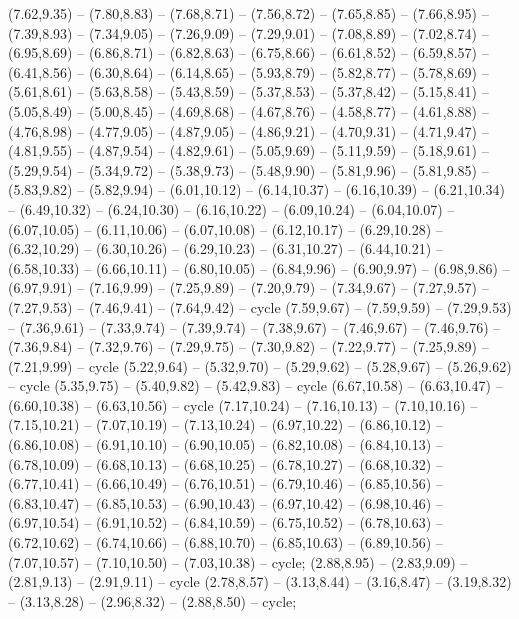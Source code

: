 { (7.62,9.35) -- (7.80,8.83) -- (7.68,8.71) -- (7.56,8.72) -- (7.65,8.85) -- (7.66,8.95) -- (7.39,8.93) -- (7.34,9.05) -- (7.26,9.09) -- (7.29,9.01) -- (7.08,8.89) -- (7.02,8.74) -- (6.95,8.69) -- (6.86,8.71) -- (6.82,8.63) -- (6.75,8.66) -- (6.61,8.52) -- (6.59,8.57) -- (6.41,8.56) -- (6.30,8.64) -- (6.14,8.65) -- (5.93,8.79) -- (5.82,8.77) -- (5.78,8.69) -- (5.61,8.61) -- (5.63,8.58) -- (5.43,8.59) -- (5.37,8.53) -- (5.37,8.42) -- (5.15,8.41) -- (5.05,8.49) -- (5.00,8.45) -- (4.69,8.68) -- (4.67,8.76) -- (4.58,8.77) -- (4.61,8.88) -- (4.76,8.98) -- (4.77,9.05) -- (4.87,9.05) -- (4.86,9.21) -- (4.70,9.31) -- (4.71,9.47) -- (4.81,9.55) -- (4.87,9.54) -- (4.82,9.61) -- (5.05,9.69) -- (5.11,9.59) -- (5.18,9.61) -- (5.29,9.54) -- (5.34,9.72) -- (5.38,9.73) -- (5.48,9.90) -- (5.81,9.96) -- (5.81,9.85) -- (5.83,9.82) -- (5.82,9.94) -- (6.01,10.12) -- (6.14,10.37) -- (6.16,10.39) -- (6.21,10.34) -- (6.49,10.32) -- (6.24,10.30) -- (6.16,10.22) -- (6.09,10.24) -- (6.04,10.07) -- (6.07,10.05) -- (6.11,10.06) -- (6.07,10.08) -- (6.12,10.17) -- (6.29,10.28) -- (6.32,10.29) -- (6.30,10.26) -- (6.29,10.23) -- (6.31,10.27) -- (6.44,10.21) -- (6.58,10.33) -- (6.66,10.11) -- (6.80,10.05) -- (6.84,9.96) -- (6.90,9.97) -- (6.98,9.86) -- (6.97,9.91) -- (7.16,9.99) -- (7.25,9.89) -- (7.20,9.79) -- (7.34,9.67) -- (7.27,9.57) -- (7.27,9.53) -- (7.46,9.41) -- (7.64,9.42) -- cycle (7.59,9.67) -- (7.59,9.59) -- (7.29,9.53) -- (7.36,9.61) -- (7.33,9.74) -- (7.39,9.74) -- (7.38,9.67) -- (7.46,9.67) -- (7.46,9.76) -- (7.36,9.84) -- (7.32,9.76) -- (7.29,9.75) -- (7.30,9.82) -- (7.22,9.77) -- (7.25,9.89) -- (7.21,9.99) -- cycle (5.22,9.64) -- (5.32,9.70) -- (5.29,9.62) -- (5.28,9.67) -- (5.26,9.62) -- cycle (5.35,9.75) -- (5.40,9.82) -- (5.42,9.83) -- cycle (6.67,10.58) -- (6.63,10.47) -- (6.60,10.38) -- (6.63,10.56) -- cycle (7.17,10.24) -- (7.16,10.13) -- (7.10,10.16) -- (7.15,10.21) -- (7.07,10.19) -- (7.13,10.24) -- (6.97,10.22) -- (6.86,10.12) -- (6.86,10.08) -- (6.91,10.10) -- (6.90,10.05) -- (6.82,10.08) -- (6.84,10.13) -- (6.78,10.09) -- (6.68,10.13) -- (6.68,10.25) -- (6.78,10.27) -- (6.68,10.32) -- (6.77,10.41) -- (6.66,10.49) -- (6.76,10.51) -- (6.79,10.46) -- (6.85,10.56) -- (6.83,10.47) -- (6.85,10.53) -- (6.90,10.43) -- (6.97,10.42) -- (6.98,10.46) -- (6.97,10.54) -- (6.91,10.52) -- (6.84,10.59) -- (6.75,10.52) -- (6.78,10.63) -- (6.72,10.62) -- (6.74,10.66) -- (6.88,10.70) -- (6.85,10.63) -- (6.89,10.56) -- (7.07,10.57) -- (7.10,10.50) -- (7.03,10.38) -- cycle;
 (2.88,8.95) -- (2.83,9.09) -- (2.81,9.13) -- (2.91,9.11) -- cycle (2.78,8.57) -- (3.13,8.44) -- (3.16,8.47) -- (3.19,8.32) -- (3.13,8.28) -- (2.96,8.32) -- (2.88,8.50) -- cycle;
}
